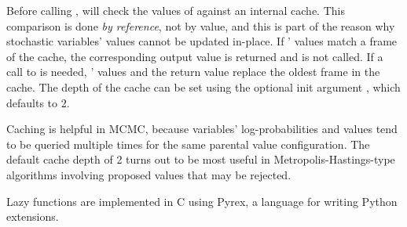 Before calling ,  will check the values of  against an internal cache. This comparison is done \emph{by reference}, not by value, and this is part of the reason why stochastic variables' values cannot be updated in-place. If ' values match a frame of the cache, the corresponding output value is returned and  is not called. If a call to  is needed, ' values and the return value replace the oldest frame in the cache. The depth of the cache can be set using the optional init argument , which defaults to 2.

Caching is helpful in MCMC, because variables' log-probabilities and values tend to be queried multiple times for the same parental value configuration. The default cache depth of 2 turns out to be most useful in Metropolis-Hastings-type algorithms involving proposed values that may be rejected.

Lazy functions are implemented in C using Pyrex, a language for writing Python extensions.
